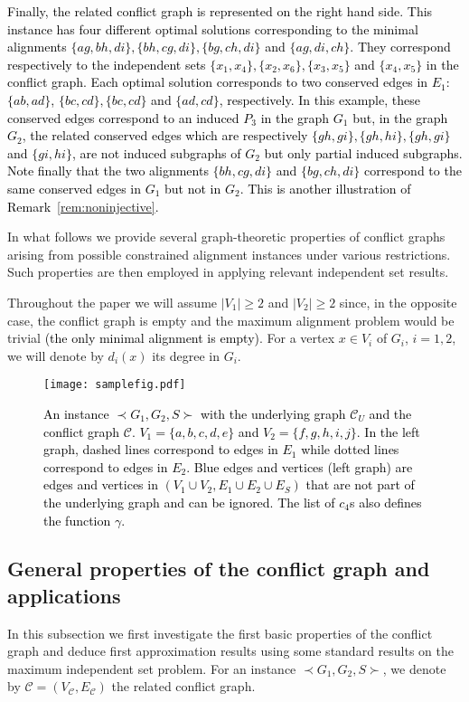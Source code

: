 \documentclass[final]{dmtcs-episciences}
\newcommand\mar[1]{\textcolor{black}{#1}}
\begin{document}
\mar{Finally, the related conflict graph is represented on the right hand side. 
This instance has four different optimal solutions corresponding to the minimal alignments $\{ag,bh,di\}, \{bh,cg,di\}, \{bg,ch,di\}$ and $\{ag,di,ch\}$. They correspond respectively to the independent sets $\{x_1,x_4\}, \{x_2,x_6\}, \{x_3,x_5\}$ and $\{x_4,x_5\}$ in the conflict graph. Each optimal solution corresponds to two conserved edges in $E_1$: $\{ab,ad\}$, $\{bc,cd\}, \{bc,cd\}$ and $\{ad,cd\}$, respectively. In this example, these conserved edges correspond to an induced $P_3$ in the graph $G_1$ but, in the graph $G_2$, the related conserved edges which are respectively  $\{gh,gi\}, \{gh,hi\}, \{gh,gi\}$ and $\{gi,hi\}$, are not induced subgraphs of $G_2$ but only partial induced subgraphs. Note finally that the two alignments $\{bh,cg,di\}$ and $\{bg,ch,di\}$ correspond to the same conserved edges in $G_1$ but not in $G_2$. This is another illustration of Remark~\ref{rem:noninjective}.} 


In what follows we provide several graph-theoretic properties of conflict graphs
arising from possible constrained alignment instances under various restrictions. 
Such properties are then employed in applying relevant independent set 
results. 

Throughout the paper we will assume $|V_1|\geq 2$ and $|V_2|\geq 2$ since, in the opposite case, the conflict graph is empty and the maximum alignment problem would be trivial \mar{(the only minimal alignment is empty)}. For a vertex $x\in V_i$ of $G_i$, $i=1,2$, we will denote by $d_i(x)$ its degree in $G_i$.

\begin{figure}[t]	   
\begin{center}	   
\texttt{[image: samplefig.pdf]} 
\caption{\sf \mar{An instance $\prec G_1,G_2,S\succ$ with the underlying graph $\mathcal{C}_U$ and the conflict graph $\mathcal{C}$. $V_1=\{a,b,c,d,e\}$ and $V_2=\{f,g,h,i,j\}$. In the left graph, dashed lines correspond to edges in $E_1$ while dotted lines correspond to edges in $E_2$. Blue edges and vertices (left graph) are edges and vertices in $(V_1\cup V_2, E_1\cup E_2\cup E_S)$ that are not part of the underlying graph and can be ignored. The list of $c_4$s also defines the function $\gamma$. }
} 
\label{sample}	   
\end{center}	   
\vspace*{-.4cm}	   
\end{figure}


\subsection{General properties of the conflict graph and applications}\label{sec:anym1m2}
In this subsection we first investigate the first basic properties of the conflict graph and deduce first approximation results using some standard results on the maximum independent set problem. For an instance $\prec G_1,G_2,S \succ$, we denote by $\mathcal{C}=(V_\mathcal{C},E_\mathcal{C})$ the related conflict graph.
\end{document}
